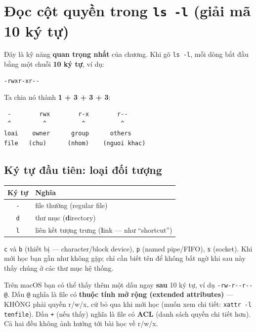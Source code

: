 \documentclass[12pt,a4paper]{article}
\newcommand{\cmd}[1]{\texttt{#1}}
\begin{document}
\section{Đọc cột quyền trong \texttt{ls -l} (giải mã 10 ký tự)}

Đây là kỹ năng \textbf{quan trọng nhất} của chương. Khi gõ \cmd{ls -l}, mỗi dòng bắt
đầu bằng một chuỗi \textbf{10 ký tự}, ví dụ:

\begin{Verbatim}
-rwxr-xr--
\end{Verbatim}

Ta chia nó thành \textbf{1 + 3 + 3 + 3}:

\begin{Verbatim}
 -        rwx        r-x        r--
 ^         ^          ^          ^
loai    owner      group      others
file   (chu)      (nhom)    (nguoi khac)
\end{Verbatim}

\subsection{Ký tự đầu tiên: loại đối tượng}

\begin{center}
\begin{tabular}{|c|>{\raggedright\arraybackslash}p{9cm}|}
\hline
\rowcolor{tablehead}\textbf{Ký tự} & \textbf{Nghĩa} \\
\hline
\cmd{-} & file thường (regular file) \\
\hline
\cmd{d} & thư mục (\textbf{d}irectory) \\
\hline
\cmd{l} & liên kết tượng trưng (\textbf{l}ink --- như ``shortcut'') \\
\hline
\end{tabular}
\end{center}

\begin{notebox}
\cmd{c} và \cmd{b} (thiết bị --- character/block device), \cmd{p} (named pipe/FIFO),
\cmd{s} (socket). Khi mới học bạn gần như không gặp; chỉ cần biết tên để không bất
ngờ khi sau này thấy chúng ở các thư mục hệ thống.
\end{notebox}

\begin{notebox}
Trên macOS bạn có thể thấy thêm một dấu ngay \textbf{sau} 10 ký tự, ví dụ
\cmd{-rw-r-{}-r-{}-@}. Dấu \cmd{@} nghĩa là file có \textbf{thuộc tính mở rộng
(extended attributes)} --- KHÔNG phải quyền r/w/x, cứ bỏ qua khi mới học (muốn xem
chi tiết: \cmd{xattr -l tenfile}). Dấu \cmd{+} (nếu thấy) nghĩa là file có
\textbf{ACL} (danh sách quyền chi tiết hơn). Cả hai đều không ảnh hưởng tới bài học
về r/w/x.
\end{notebox}
\end{document}

